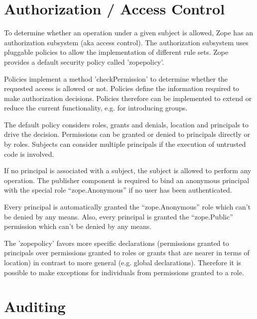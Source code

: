 \documentclass[10pt,a4paper,english]{scrbook}
\begin{document}

\hypertarget{authorization-access-control}{}
\section{Authorization / Access Control}

To determine whether an operation under a given subject is allowed, Zope has an
authorization subsystem (aka access control). The authorization subsystem uses
pluggable policies to allow the implementation of different rule sets. Zope
provides a default security policy called 'zopepolicy'.

Policies implement a method 'checkPermission' to determine whether the
requested access is allowed or not. Policies define the information required to
make authorization decisions.  Policies therefore can be implemented to extend
or reduce the current functionality, e.g. for introducing groups.

The default policy considers roles, grants and denials, location and principals
to drive the decision. Permissions can be granted or denied to principals
directly or by roles.  Subjects can consider multiple principals if the
execution of untrusted code is involved.

If no principal is associated with a subject, the subject is allowed to perform
any operation. The publisher component is required to bind an anonymous
principal with the special role ``zope.Anonymous'' if no user has been
authenticated.

Every principal is automatically granted the ``zope.Anonymous'' role which can't be
denied by any means. Also, every principal is granted the ``zope.Public''
permission which can't be denied by any means.

The 'zopepolicy' favors more specific declarations (permissions granted to
principals over permissions granted to roles or grants that are nearer in terms
of location) in contrast to more general (e.g. global declarations). Therefore
it is possible to make exceptions for individuals from permissions granted to a
role.



\hypertarget{auditing}{}
\section{Auditing}
\end{document}
